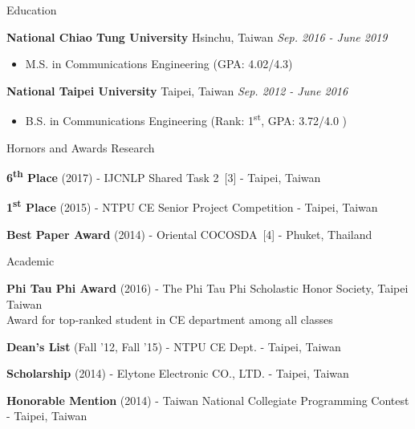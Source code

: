 \documentclass{resume_short} %
\newcommand{\ts}{\textsuperscript}
\begin{document}

\begin{rSection}{Education}

{\bf National Chiao Tung University} \hfill{Hsinchu, Taiwan} \hfill{\em Sep. 2016 - June 2019}
\begin{itemize} \item {M.S. in Communications Engineering (GPA: 4.02/4.3)} \end{itemize}
{\bf National Taipei University}\hspace*{2em} \hfill{Taipei, Taiwan} \hfill{\em Sep. 2012 - June 2016}
\begin{itemize} \item {B.S. in Communications Engineering (Rank: 1\ts{st}, GPA: 3.72/4.0 )} \end{itemize}
\end{rSection}


\begin{rSection}{Hornors and Awards}
    Research
    \begin{rSubsection}{}{}{}{}
    \item {\bf 6\ts{th} Place} (2017) - IJCNLP Shared Task 2~[3] - Taipei, Taiwan
    \item {\bf 1\ts{st} Place} (2015) - NTPU CE Senior Project Competition - Taipei, Taiwan
    \item {\bf Best Paper Award} (2014) - Oriental COCOSDA~[4] - Phuket, Thailand
    \end{rSubsection}
    Academic
    \begin{rSubsection}{}{}{}{}
    \item {\bf Phi Tau Phi Award} (2016) - The Phi Tau Phi Scholastic Honor Society, Taipei Taiwan \\
    Award for top-ranked student in CE department among all classes
    \item {\bf Dean's List} (Fall '12, Fall '15) - NTPU CE Dept. - Taipei, Taiwan
    \item {\bf Scholarship} (2014) - Elytone Electronic CO., LTD. - Taipei, Taiwan
    \item {\bf Honorable Mention} (2014) - Taiwan National Collegiate Programming Contest - Taipei, Taiwan
    \end{rSubsection}
    \end{rSection}
\end{document}
